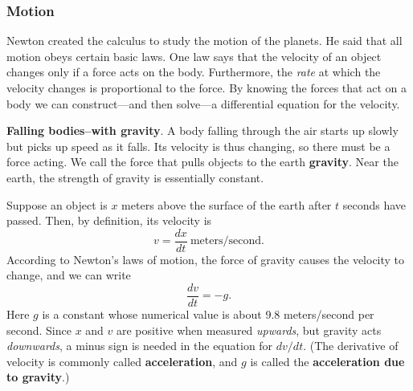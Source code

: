 \subsubsection{Motion}
\label{subsubsec:motion}

	Newton created the calculus to study the motion of the planets.  He said that all motion obeys certain basic laws.  One law says that the velocity of an object changes only if a force acts on the body.  Furthermore, the {\em rate\/} at which the velocity changes is proportional to the force.  By knowing the forces that act on a body we can construct---and then solve---a differential equation for the velocity.  





{\bf Falling bodies--with gravity}. A body
falling through the air starts up slowly but picks up speed as it
falls.  Its velocity is thus changing, so there must be a force
acting.  We call the force that pulls objects to the earth {\bf
  gravity}. Near the earth, the strength of gravity is
essentially constant.

Suppose an object is $x$ meters above the surface of the earth after
$t$ seconds have passed.  Then, by definition, its velocity is
	\[
v = \dfrac{dx}{dt} \ \mbox{meters/second}.
\]
According to Newton's laws of motion, the force of gravity causes the velocity to change, and we can write
	\[
\dfrac{dv}{dt} = -g.
\]
Here $g$ is a constant whose numerical value is about 9.8 meters/second per second.  Since $x$ and $v$ are positive when measured {\em upwards}, but gravity acts {\em downwards}, a minus sign is needed in the equation for $dv/dt$.  (The derivative of velocity is commonly called {\bf acceleration}, and $g$ is called the {\bf acceleration due to gravity}.)


